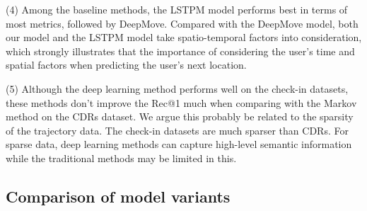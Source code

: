 \documentclass[10pt,journal,compsoc]{IEEEtran}
\begin{document}
(4)	Among the baseline methods, the LSTPM model performs best in terms of most metrics, followed by DeepMove. Compared with the DeepMove model, both our model and the LSTPM model take spatio-temporal factors into consideration, which strongly illustrates that the importance of considering the user's time and spatial factors when predicting the user's next location.

(5)	Although the deep learning method performs well on the check-in datasets, these methods don't improve the Rec@1 much when comparing with the Markov method on the CDRs dataset. We argue this probably be related to the sparsity of the trajectory data. The check-in datasets are much sparser than CDRs. For sparse data, deep learning methods can capture high-level semantic information while the traditional methods may be limited in this.

\subsection{Comparison of model variants}
\end{document}
